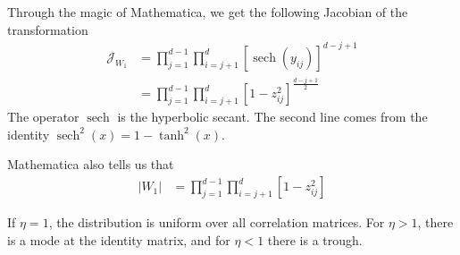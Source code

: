 \documentclass[letter,11pt]{article}
\DeclareMathOperator\sech{sech}
\begin{document}
Through the magic of Mathematica, we get the following Jacobian of the transformation
\begin{align}
  \label{eq:8}
  \mathcal{J}_{W_1}&=\prod_{j=1}^{d-1}\prod_{i=j+1}^d\left[\sech(y_{ij})\right]^{d-j+1}\\
&=\prod_{j=1}^{d-1}\prod_{i=j+1}^d\left[1-z_{ij}^2\right]^{\frac{d-j+1}{2}}
\end{align}
The operator $\sech$ is the hyperbolic secant.  The second line comes
from the identity $\sech^2(x)=1-\tanh^2(x)$.

Mathematica also tells us that
\begin{align}
  \label{eq:9}
  |W_1|&=\prod_{j=1}^{d-1}\prod_{i=j+1}^d\left[1-z_{ij}^2\right]
\end{align}


If $\eta=1$, the distribution is uniform over all correlation
matrices.  For $\eta>1$, there is a mode at the identity matrix, and
for $\eta<1$ there is a trough.




\printbibliography
\end{document}
